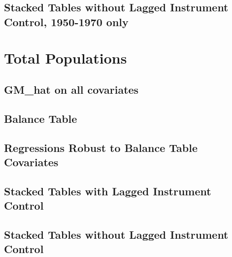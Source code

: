 \documentclass{article}
\begin{document}
\subsection{Stacked Tables without Lagged Instrument Control, 1950-1970 only}


\clearpage


\clearpage

\section{Total Populations}
\subsection{GM\_hat on all covariates}

\clearpage
\subsection{Balance Table}

\clearpage
\subsection{Regressions Robust to Balance Table Covariates}
\begin{landscape}

\clearpage

\clearpage

\clearpage

\clearpage
\end{landscape}



\subsection{Stacked Tables with Lagged Instrument Control}



\clearpage


\clearpage

\subsection{Stacked Tables without Lagged Instrument Control}


\clearpage


\clearpage
\end{document}

